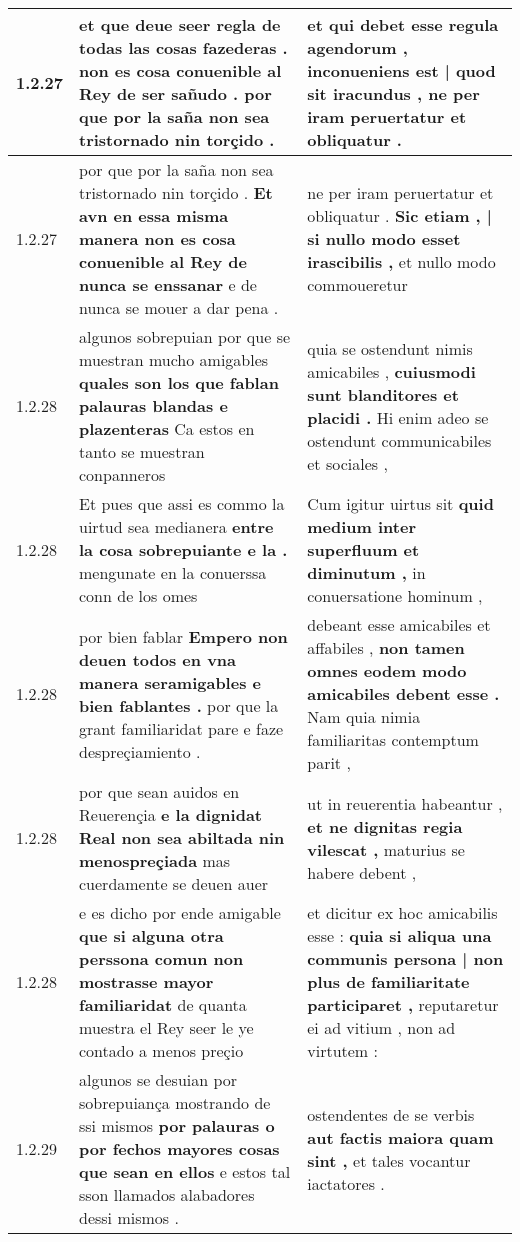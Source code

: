 \begin{tabular}{|p{1cm}|p{6.5cm}|p{6.5cm}|}
1.2.27 & et que deue seer regla de todas las cosas fazederas . \textbf{ non es cosa conuenible al Rey de ser sañudo . } por que por la saña non sea tristornado nin torçido . & et qui debet esse regula agendorum , \textbf{ inconueniens est | quod sit iracundus , } ne per iram peruertatur et obliquatur . \\\hline
1.2.27 & por que por la saña non sea tristornado nin torçido . \textbf{ Et avn en essa misma manera non es cosa conuenible al Rey de nunca se enssanar } e de nunca se mouer a dar pena . & ne per iram peruertatur et obliquatur . \textbf{ Sic etiam , | si nullo modo esset irascibilis , } et nullo modo commoueretur \\\hline
1.2.28 & algunos sobrepuian por que se muestran mucho amigables \textbf{ quales son los que fablan palauras blandas e plazenteras } Ca estos en tanto se muestran conpanneros & quia se ostendunt nimis amicabiles , \textbf{ cuiusmodi sunt blanditores et placidi . } Hi enim adeo se ostendunt communicabiles et sociales , \\\hline
1.2.28 & Et pues que assi es commo la uirtud sea medianera \textbf{ entre la cosa sobrepuiante e la . } mengunate en la conuerssa conn de los omes & Cum igitur uirtus sit \textbf{ quid medium inter superfluum et diminutum , } in conuersatione hominum , \\\hline
1.2.28 & por bien fablar \textbf{ Empero non deuen todos en vna manera seramigables e bien fablantes . } por que la grant familiaridat pare e faze despreçiamiento . & debeant esse amicabiles et affabiles , \textbf{ non tamen omnes eodem modo amicabiles debent esse . } Nam quia nimia familiaritas contemptum parit , \\\hline
1.2.28 & por que sean auidos en Reuerençia \textbf{ e la dignidat Real non sea abiltada nin menospreçiada } mas cuerdamente se deuen auer & ut in reuerentia habeantur , \textbf{ et ne dignitas regia vilescat , } maturius se habere debent , \\\hline
1.2.28 & e es dicho por ende amigable \textbf{ que si alguna otra perssona comun non mostrasse mayor familiaridat } de quanta muestra el Rey seer le ye contado a menos preçio & et dicitur ex hoc amicabilis esse : \textbf{ quia si aliqua una communis persona | non plus de familiaritate participaret , } reputaretur ei ad vitium , non ad virtutem : \\\hline
1.2.29 & algunos se desuian por sobrepuiança mostrando de ssi mismos \textbf{ por palauras o por fechos mayores cosas que sean en ellos } e estos tal sson llamados alabadores dessi mismos . & ostendentes de se verbis \textbf{ aut factis maiora quam sint , } et tales vocantur iactatores . \\\hline

\end{tabular}
